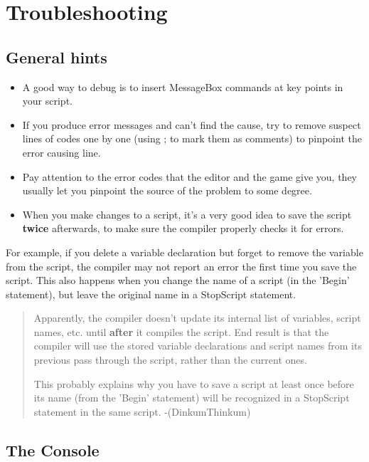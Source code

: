 \hypertarget{troubleshooting}{%
\section{Troubleshooting}\label{troubleshooting}}

\hypertarget{general-hints}{%
\subsection{General hints}\label{general-hints}}

\begin{itemize}
\item
  A good way to debug is to insert MessageBox commands at key points in
  your script.
\item
  If you produce error messages and can't find the cause, try to remove
  suspect lines of codes one by one (using ; to mark them as comments)
  to pinpoint the error causing line.
\item
  Pay attention to the error codes that the editor and the game give
  you, they usually let you pinpoint the source of the problem to some
  degree.
\item
  When you make changes to a script, it's a very good idea to save the
  script \textbf{twice} afterwards, to make sure the compiler properly
  checks it for errors.
\end{itemize}

For example, if you delete a variable declaration but forget to remove
the variable from the script, the compiler may not report an error the
first time you save the script. This also happens when you change the
name of a script (in the 'Begin' statement), but leave the original name
in a StopScript statement.

\begin{quote}
Apparently, the compiler doesn't update its internal list of variables,
script names, etc. until \textbf{after} it compiles the script. End
result is that the compiler will use the stored variable declarations
and script names from its previous pass through the script, rather than
the current ones.

This probably explains why you have to save a script at least once
before its name (from the 'Begin' statement) will be recognized in a
StopScript statement in the same script. -(DinkumThinkum)
\end{quote}

\hypertarget{the-console}{%
\subsection{The Console}\label{the-console}}

